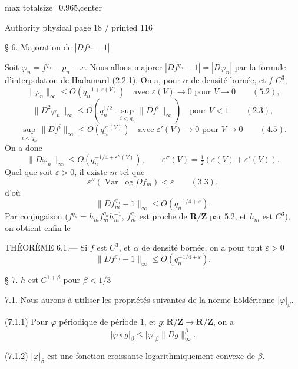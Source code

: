 \documentclass{article}
\begin{document}
\newpage
\noindent\begin{adjustbox}{max totalsize={\textwidth}{0.965\textheight},center}\begin{minipage}{\textwidth}
\noindent\hfill\scriptsize Authority physical page 18 / printed 116\par\normalsize
§ 6. Majoration de \(\left|Df^{q_n}-1\right|\)

Soit \(\varphi_n=f^{q_n}-p_n-x\). Nous allons majorer \(\left|Df^{q_n}-1\right|=|D\varphi_n|\) par la formule d’interpolation de Hadamard (2.2.1). On a, pour \(\alpha\) de densité bornée, et \(f\) \(C^3\),
\[
\|\varphi_n\|_\infty\leq O\!\left(q_n^{-1+\varepsilon(V)}\right)
\quad\text{avec }\varepsilon(V)\to0\text{ pour }V\to0 \qquad(5.2),
\]
\[
\|D^2\varphi_n\|_\infty\leq O\!\left(q_n^{1/2}\cdot
\sup_{i<q_n}\|Df^i\|_\infty\right)
\quad\text{pour }V<1 \qquad(2.3),
\]
\[
\sup_{i<q_n}\|Df^i\|_\infty\leq O\!\left(q_n^{\varepsilon'(V)}\right)
\quad\text{avec }\varepsilon'(V)\to0\text{ pour }V\to0 \qquad(4.5).
\]
On a donc
\[
\|D\varphi_n\|_\infty\leq O\!\left(q_n^{-1/4+\varepsilon''(V)}\right),
\qquad \varepsilon''(V)=\tfrac12(\varepsilon(V)+\varepsilon'(V)).
\]
Quel que soit \(\varepsilon>0\), il existe \(m\) tel que
\[
\varepsilon''(\operatorname{Var}\log Df_m)<\varepsilon\qquad(3.3),
\]
d’où
\[
\|Df_m^{q_n}-1\|_\infty\leq O\!\left(q_n^{-1/4+\varepsilon}\right).
\]
Par conjugaison (\(f^{q_n}=h_mf_m^{q_n}h_m^{-1}\), \(f_m^{q_n}\) est proche de \(\mathbf R/\mathbf Z\) par 5.2, et \(h_m\) est \(C^3\)), on obtient enfin le

THÉORÈME 6.1.— Si \(f\) est \(C^3\), et \(\alpha\) de densité bornée, on a pour tout \(\varepsilon>0\)
\[
\|Df^{q_n}-1\|_\infty\leq O\!\left(q_n^{-1/4+\varepsilon}\right).
\]

§ 7. \(h\) est \(C^{1+\beta}\) pour \(\beta<1/3\)

7.1. Nous aurons à utiliser les propriétés suivantes de la norme höldérienne \(|\varphi|_\beta\).

(7.1.1) Pour \(\varphi\) périodique de période \(1\), et \(g:\mathbf R/\mathbf Z\to\mathbf R/\mathbf Z\), on a
\[
|\varphi\circ g|_\beta\leq|\varphi|_\beta\|Dg\|_\infty^\beta.
\]

(7.1.2) \(|\varphi|_\beta\) est une fonction croissante logarithmiquement convexe de \(\beta\).
\end{minipage}\end{adjustbox}
\end{document}

